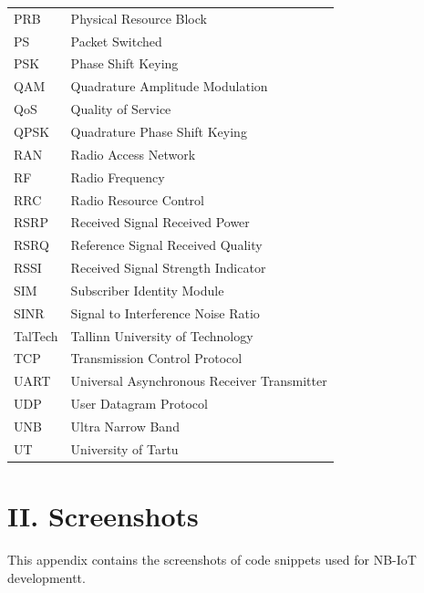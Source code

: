 \documentclass[12pt]{article}
\begin{document}
\begin{table}[H]
{\begin{tabular}{ll}
PRB          & Physical Resource Block                       \\
PS           & Packet Switched                               \\
PSK          & Phase Shift Keying                            \\
QAM          & Quadrature Amplitude Modulation               \\
QoS          & Quality of Service                            \\
QPSK         & Quadrature Phase Shift Keying                 \\
RAN          & Radio Access Network                          \\
RF           & Radio Frequency                               \\
RRC          & Radio Resource Control                        \\
RSRP         & Received Signal Received Power                \\
RSRQ         & Reference Signal Received Quality             \\
RSSI         & Received Signal Strength Indicator            \\
SIM          & Subscriber Identity Module                    \\
SINR         & Signal to Interference Noise Ratio            \\
TalTech      & Tallinn University of Technology              \\
TCP          & Transmission Control Protocol                 \\
UART         & Universal Asynchronous Receiver Transmitter   \\
UDP          & User Datagram Protocol                        \\
UNB          & Ultra Narrow Band                             \\
UT           & University of Tartu                          
\end{tabular}}
\end{table}
\newpage


\section*{II. Screenshots}
This appendix contains the screenshots of code snippets used for NB-IoT developmentt.
\end{document}
